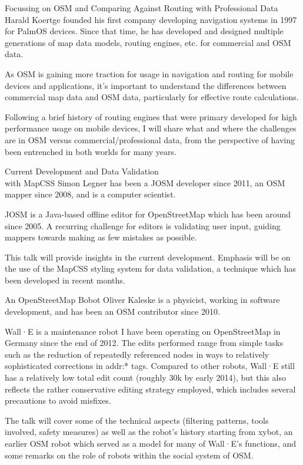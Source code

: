 %
{Focussing on OSM and Comparing Against Routing with Professional Data}%
{Harald Koertge founded his first company developing navigation systems in 1997 for PalmOS devices. Since that time, he has developed and designed multiple generations of map data models, routing engines, etc. for commercial and OSM data.}%
{As OSM is gaining more traction for usage in navigation and routing for mobile devices and applications, it’s important to understand the differences between commercial map data and OSM data, particularly for effective route calculations. 

Following a brief history of routing engines that were primary developed for high performance usage on mobile devices, I will share what and where the challenges are in OSM versus commercial/professional data, from the perspective of having been entrenched in both worlds for many years.}

%
{Current Development and Data Validation\\ with MapCSS}%
{Simon Legner has been a JOSM developer since 2011, an OSM mapper since 2008, and is a computer scientist.}%
{JOSM is a Java-based offline editor for OpenStreetMap which has been around since 2005. A recurring challenge for editors is validating user input, guiding mappers towards making as few mistakes as possible.

This talk will provide insights in the current development. Emphasis will be on the use of the MapCSS styling system for data validation, a technique which has been developed in recent months.}

%
{An OpenStreetMap Bobot}%
{Oliver Kaleske is a physicist, working in software development, and has been an OSM contributor since 2010.}%
{Wall·E is a maintenance robot I have been operating on OpenStreetMap in Germany since the end of 2012. The edits performed range from simple tasks such as the reduction of repeatedly referenced nodes in
ways to relatively sophisticated corrections in addr:* tags. Compared to other robots, Wall·E still has a relatively low total edit count (roughly 30k by early 2014), but this also
reflects the rather conservative editing strategy employed, which includes several precautions to avoid misfixes.

The talk will cover some of the technical aspects (filtering patterns, tools involved, safety measures) as well as the robot's history starting from xybot, an earlier OSM robot which served as
a model for many of Wall·E's functions, and some remarks on the role of robots within the social system of OSM.}

